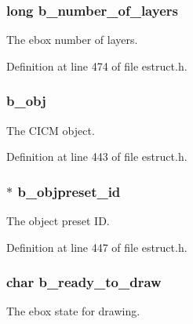 \hypertarget{struct__ebox_a84105957ca11a224cf734f350fb23ac9}{
\subsubsection[{b\-\_\-number\-\_\-of\-\_\-layers}]{\setlength{\rightskip}{0pt plus 5cm}long b\-\_\-number\-\_\-of\-\_\-layers}}\label{struct__ebox_a84105957ca11a224cf734f350fb23ac9}
The ebox number of layers. 

Definition at line 474 of file estruct.\-h.

\hypertarget{struct__ebox_a384a670299e98768527fbe457de9a38a}{
\subsubsection[{b\-\_\-obj}]{ b\-\_\-obj}}\label{struct__ebox_a384a670299e98768527fbe457de9a38a}
The C\-I\-C\-M object. 

Definition at line 443 of file estruct.\-h.

\hypertarget{struct__ebox_adc377263d208d1051f4a0997868b1155}{
\subsubsection[{b\-\_\-objpreset\-\_\-id}]{$\ast$ b\-\_\-objpreset\-\_\-id}}\label{struct__ebox_adc377263d208d1051f4a0997868b1155}
The object preset I\-D. 

Definition at line 447 of file estruct.\-h.

\hypertarget{struct__ebox_a234ea03e103bd45f5fa1d27b8e69b5dd}{
\subsubsection[{b\-\_\-ready\-\_\-to\-\_\-draw}]{\setlength{\rightskip}{0pt plus 5cm}char b\-\_\-ready\-\_\-to\-\_\-draw}}\label{struct__ebox_a234ea03e103bd45f5fa1d27b8e69b5dd}
The ebox state for drawing. 

